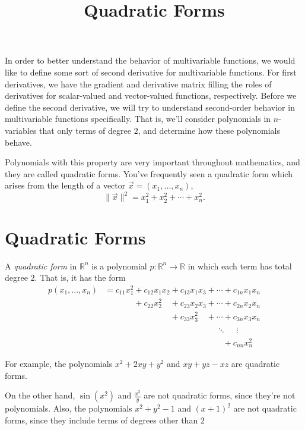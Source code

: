 \documentclass{ximera}
\title{Quadratic Forms}
\begin{document}
\begin{abstract}
\end{abstract}
\maketitle

In order to better understand the behavior of multivariable functions, we would like to define some sort of second derivative for multivariable functions. For first derivatives, we have the gradient and derivative matrix filling the roles of derivatives for scalar-valued and vector-valued functions, respectively. Before we define the second derivative, we will try to understand second-order behavior in multivariable functions specifically. That is, we'll consider polynomials in $n$-variables that only terms of degree $2$, and determine how these polynomials behave.

Polynomials with this property are very important throughout mathematics, and they are called quadratic forms. You've frequently seen a quadratic form which arises from the length of a vector $\vec{x} = (x_1,...,x_n)$,
\[
\|\vec{x}\|^2 = x_1^2 + x_2^2 + \cdots + x_n^2.
\]

\section*{Quadratic Forms}

\begin{definition}
A \emph{quadratic form} in $\mathbb{R}^n$ is a polynomial $p:\mathbb{R}^n\rightarrow\mathbb{R}$ in which each term has total degree $2$. That is, it has the form
\begin{align*}
p(x_1,...,x_n) &= c_{11}x_1^2+c_{12}x_1x_2+c_{13}x_1x_3 + \cdots + c_{1n}x_1x_n\\
&\phantom{= c_{11}x_1^2}+c_{22}x_2^2\phantom{x_2}+c_{23}x_2x_3 + \cdots + c_{2n}x_2x_n\\
&\phantom{= c_{11}x_1^2+c_{12}x_1x_2}+c_{33}x_3^2\phantom{x_3} + \cdots + c_{3n}x_3x_n\\
&\phantom{= c_{11}x_1^2+c_{12}x_1x_2+c_{13}x_1x_3 +} \ddots \phantom{+} \vdots\\
&\phantom{= c_{11}x_1^2+c_{12}x_1x_2+c_{13}x_1x_3 + \cdots }+ c_{nn}x_n^2
\end{align*}
\end{definition}

\begin{example}
For example, the polynomials $x^2+2xy+y^2$ and $xy+yz-xz$ are quadratic forms.

On the other hand, $\sin(x^2)$ and $\frac{x^3}{y}$ are not quadratic forms, since they're not polynomials. Also, the polynomials $x^2+y^2-1$ and $(x+1)^2$ are not quadratic forms, since they include terms of degrees other than $2$
\end{example}
\end{document}
